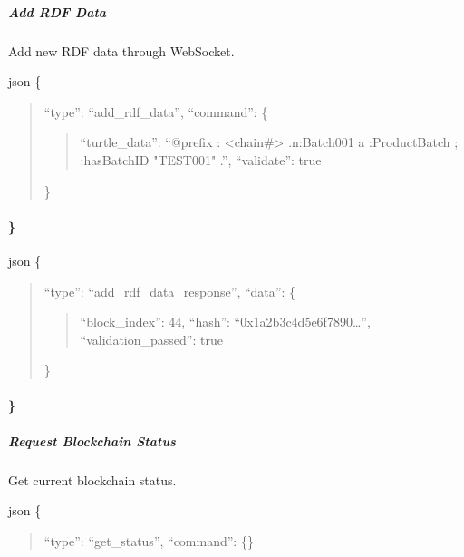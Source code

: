 \documentclass[letterpaper,10pt,english]{sphinxmanual}
\begin{document}
\subparagraph{Add RDF Data}
\label{\detokenize{api/websocket-api:add-rdf-data}}
\sphinxAtStartPar
Add new RDF data through WebSocket.

\sphinxAtStartPar
{}
{\color{red}\bfseries{}\textasciigrave{}\textasciigrave{}}{\color{red}\bfseries{}\textasciigrave{}}json
\{
\begin{quote}

\sphinxAtStartPar
“type”: “add\_rdf\_data”,
“command”: \{
\begin{quote}

\sphinxAtStartPar
“turtle\_data”: “@prefix : \textless{}\sphinxhyphen{}chain\#\textgreater{} .n:Batch001 a :ProductBatch ; :hasBatchID "TEST\sphinxhyphen{}001" .”,
“validate”: true
\end{quote}

\sphinxAtStartPar
\}
\end{quote}


\paragraph{\}}
\label{\detokenize{api/websocket-api:id90}}
\sphinxAtStartPar
{}
{\color{red}\bfseries{}\textasciigrave{}\textasciigrave{}}{\color{red}\bfseries{}\textasciigrave{}}json
\{
\begin{quote}

\sphinxAtStartPar
“type”: “add\_rdf\_data\_response”,
“data”: \{
\begin{quote}

\sphinxAtStartPar
“block\_index”: 44,
“hash”: “0x1a2b3c4d5e6f7890…”,
“validation\_passed”: true
\end{quote}

\sphinxAtStartPar
\}
\end{quote}


\paragraph{\}}
\label{\detokenize{api/websocket-api:id95}}

\subparagraph{Request Blockchain Status}
\label{\detokenize{api/websocket-api:request-blockchain-status}}
\sphinxAtStartPar
Get current blockchain status.

\sphinxAtStartPar
{}
{\color{red}\bfseries{}\textasciigrave{}\textasciigrave{}}{\color{red}\bfseries{}\textasciigrave{}}json
\{
\begin{quote}

\sphinxAtStartPar
“type”: “get\_status”,
“command”: \{\}
\end{quote}
\end{document}
